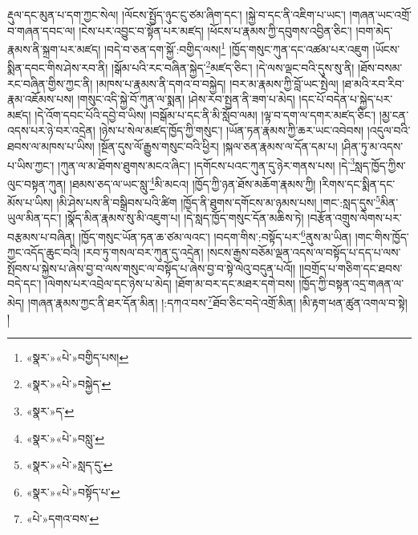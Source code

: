 རྡུལ་དང་མུན་པ་དག་ཀྱང་སེལ། །ལོངས་སྤྱོད་ཉུང་ངུ་ཙམ་ཞིག་དང་། །སྐྱེ་བ་དང་ནི་འཇིག་པ་ཡང་། །གཞན་ཡང་འགྲོ་བ་གཞན་དབང་ལ། །ངེས་པར་འབྱུང་བ་སྟོན་པར་མཛད། །ཕོངས་པ་རྣམས་ཀྱི་དབུགས་འབྱིན་ཅིང་། །བག་མེད་རྣམས་ནི་སྐྲག་པར་མཛད། །བདེ་བ་ཅན་དག་སྐྱོ་:བགྱིད་ལས།\footnote{«སྣར་»«པེ་»བགྱིད་པས།} །ཁྱོད་གསུང་ཀུན་དང་འཚམ་པར་འཇུག །ཡོངས་སྨིན་དབང་གིས་ཤེས་རབ་ནི། །སྒོམ་པའི་རང་བཞིན་སྐྱེད་\footnote{«སྣར་»«པེ་»བསྐྱེད་}མཛད་ཅིང་། །དེ་ལས་ལྡང་བའི་དུས་སུ་ནི། །ཐོས་བསམ་རང་བཞིན་གྱིས་ཀྱང་ནི། །མཁས་པ་རྣམས་ནི་དགའ་བ་བསྐྱེད། །བར་མ་རྣམས་ཀྱི་བློ་ཡང་སྤེལ། །ཐ་མའི་རབ་རིབ་རྣམ་འཇོམས་པས། །གསུང་འདི་སྐྱེ་བོ་ཀུན་ལ་སྨན། །ཤེས་རབ་སྤྱན་ནི་ཟག་པ་མེད། །དང་པོ་བདེན་པ་སྐྱེད་པར་མཛད། །དེ་འོག་དབང་པོའི་དབྱེ་བ་ཡིས། །བསྒོམ་པ་དང་ནི་མི་སློབ་ལམ། །ལྟ་བ་དག་ལ་དགར་མཛད་ཅིང་། །མྱ་ངན་འདས་པར་ཉེ་བར་འདྲེན། །ཉེས་པ་སེལ་མཛད་ཁྱོད་ཀྱི་གསུང་། །ཡོན་ཏན་རྣམས་ཀྱི་ཆར་ཡང་འབེབས། །འདུལ་བའི་ཐབས་ལ་མཁས་པ་ཡིས། །སྔོན་དུས་ལོ་རྒྱུས་གསུང་བའི་ཕྱིར། །སྐལ་ཅན་རྣམས་ལ་དོན་དམ་པ། །ཤིན་ཏུ་མ་འདས་པ་ཡིས་ཀྱང་། །ཀུན་ལ་མ་ཐོགས་ཐུགས་མངའ་ཞིང་། །དགོངས་པའང་ཀུན་དུ་ཉེར་གནས་པས། །དེ་\footnote{«སྣར་»ད་}སླད་ཁྱོད་ཀྱིས་ལུང་བསྟན་ཀུན། །ཐམས་ཅད་ལ་ཡང་སླུ་\footnote{«སྣར་»«པེ་»བསླུ་}མི་མངའ། །ཁྱོད་ཀྱི་ཉན་ཐོས་མཆོག་རྣམས་ཀྱི། །རིགས་དང་སྨིན་དང་མོས་པ་ཡིས། །མི་ཤེས་པས་ནི་བསྒྲིབས་པའི་ཚིག །ཁྱོད་ནི་ཐུགས་དགོངས་མ་ཉམས་པས། །གང་:སླད་དུས་\footnote{«སྣར་»«པེ་»སླད་དུ་}མིན་ཡུལ་མིན་དང་། །སྣོད་མིན་རྣམས་སུ་མི་འཇུག་པ། །དེ་སླད་ཁྱོད་གསུང་དོན་མཆིས་ཏེ། །བརྩོན་འགྲུས་ལེགས་པར་བརྩམས་པ་བཞིན། །ཁྱོད་གསུང་ཡོན་ཏན་ཆ་ཙམ་ལའང་། །བདག་གིས་:བསྟོད་པར་\footnote{«སྣར་»«པེ་»བསྟོད་པ་}ནུས་མ་ཡིན། །གང་གིས་ཁྱོད་ཀྱང་འདོད་ཆུང་བའི། །རབ་ཏུ་གསལ་བར་ཀུན་དུ་འདྲེན། །སངས་རྒྱས་བཅོམ་ལྡན་འདས་ལ་བསྟོད་པ་དད་པ་ལས་སྤོབས་པ་སྐྱེས་པ་ཞེས་བྱ་བ་ལས་གསུང་ལ་བསྟོད་པ་ཞེས་བྱ་བ་སྟེ་ལེའུ་བདུན་པའོ།། །།བགྲོད་པ་གཅིག་དང་ཐབས་བདེ་དང་། །ལེགས་པར་འབྲེལ་དང་ཉེས་པ་མེད། །ཐོག་མ་བར་དང་མཐར་དགེ་བས། །ཁྱོད་ཀྱི་བསྟན་འདྲ་གཞན་ལ་མེད། །གཞན་རྣམས་ཀྱང་ནི་ཐར་དོན་མིན། །:དཀའ་བས་\footnote{«པེ་»དགའ་བས་}ཐོབ་ཅིང་བདེ་འགྲོ་མིན། །མི་རྟག་ཕན་ཚུན་འགལ་བ་སྟེ། །
